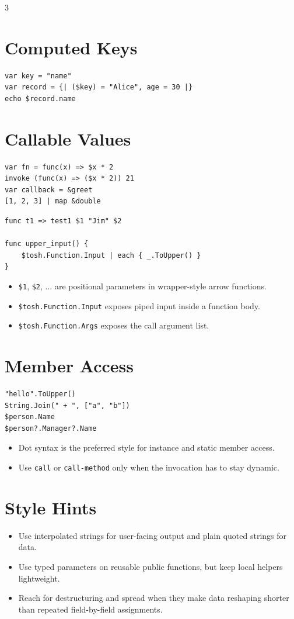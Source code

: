 \begin{multicols*}{3}
\section{Computed Keys}
\begin{lstlisting}
var key = "name"
var record = {| ($key) = "Alice", age = 30 |}
echo $record.name
\end{lstlisting}

\columnbreak

\section{Callable Values}
\begin{lstlisting}
var fn = func(x) => $x * 2
invoke (func(x) => ($x * 2)) 21
var callback = &greet
[1, 2, 3] | map &double
\end{lstlisting}

\begin{lstlisting}
func t1 => test1 $1 "Jim" $2

func upper_input() {
    $tosh.Function.Input | each { _.ToUpper() }
}
\end{lstlisting}

\begin{itemize}
\item \texttt{\$1}, \texttt{\$2}, ... are positional parameters in wrapper-style arrow functions.
\item \texttt{\$tosh.Function.Input} exposes piped input inside a function body.
\item \texttt{\$tosh.Function.Args} exposes the call argument list.
\end{itemize}

\section{Member Access}
\begin{lstlisting}
"hello".ToUpper()
String.Join(" + ", ["a", "b"])
$person.Name
$person?.Manager?.Name
\end{lstlisting}

\begin{itemize}
\item Dot syntax is the preferred style for instance and static member access.
\item Use \texttt{call} or \texttt{call-method} only when the invocation has to stay dynamic.
\end{itemize}

\section{Style Hints}
\begin{itemize}
\item Use interpolated strings for user-facing output and plain quoted strings for data.
\item Use typed parameters on reusable public functions, but keep local helpers lightweight.
\item Reach for destructuring and spread when they make data reshaping shorter than repeated field-by-field assignments.
\end{itemize}

\end{multicols*}


